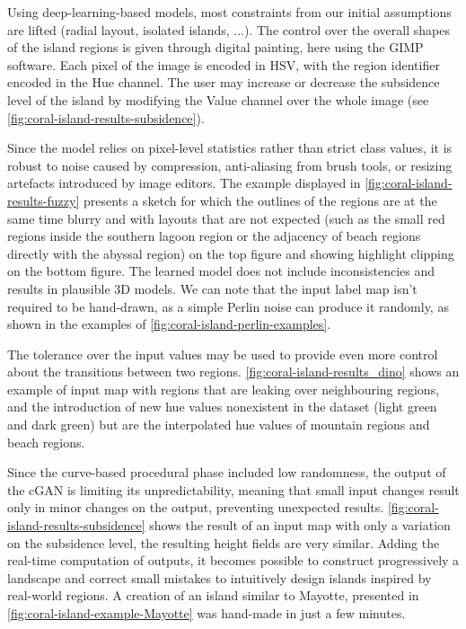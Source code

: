 Using deep-learning-based models, most constraints from our initial assumptions are lifted (radial layout, isolated islands, ...). The control over the overall shapes of the island regions is given through digital painting, here using the GIMP software. Each pixel of the image is encoded in HSV, with the region identifier encoded in the Hue channel. The user may increase or decrease the subsidence level of the island by modifying the Value channel over the whole image (see \cref{fig:coral-island-results-subsidence}).

Since the model relies on pixel-level statistics rather than strict class values, it is robust to noise caused by compression, anti-aliasing from brush tools, or resizing artefacts introduced by image editors. The example displayed in \cref{fig:coral-island-results-fuzzy} presents a sketch for which the outlines of the regions are at the same time blurry and with layouts that are not expected (such as the small red regions inside the southern lagoon region or the adjacency of beach regions directly with the abyssal region) on the top figure and showing highlight clipping on the bottom figure. The learned model does not include inconsistencies and results in plausible 3D models. We can note that the input label map isn't required to be hand-drawn, as a simple Perlin noise can produce it randomly, as shown in the examples of \cref{fig:coral-island-perlin-examples}.

The tolerance over the input values may be used to provide even more control about the transitions between two regions. \cref{fig:coral-island-results_dino} shows an example of input map with regions that are leaking over neighbouring regions, and the introduction of new hue values nonexistent in the dataset (light green and dark green) but are the interpolated hue values of mountain regions and beach regions.

Since the curve-based procedural phase included low randomness, the output of the cGAN is limiting its unpredictability, meaning that small input changes result only in minor changes on the output, preventing unexpected results. \cref{fig:coral-island-results-subsidence} shows the result of an input map with only a variation on the subsidence level, the resulting height fields are very similar. Adding the real-time computation of outputs, it becomes possible to construct progressively a landscape and correct small mistakes to intuitively design islands inspired by real-world regions. A creation of an island similar to Mayotte, presented in \cref{fig:coral-island-example-Mayotte} was hand-made in just a few minutes.

